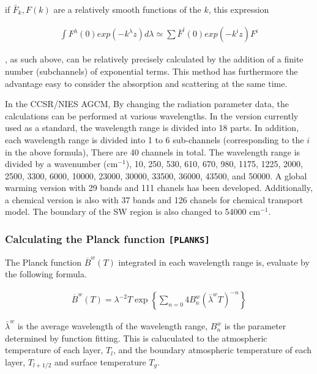 if \(\bar{F}_k, F(k)\) are a relatively smooth functions of the \(k\), this expression

\begin{eqnarray}
 \int F^\lambda(0) exp (-k^\lambda z) d \lambda 
 \simeq \sum \bar{F}^i(0) exp (-k^i z) F^i
\end{eqnarray}

\begin{quote}
\protect\hypertarget{p-rad:beer-kd}{}{ }
\end{quote}

, as such above, can be relatively precisely calculated by the addition of 
a finite number (subchannels) of exponential terms. This method has furthermore 
the advantage  easy to consider the absorption and scattering at the same time.

In the CCSR/NIES AGCM, By changing the radiation parameter data, the 
calculations can be performed at various wavelengths. In the version currently used
as a standard, the wavelength range is divided into 18 parts. In
addition, each wavelength range is divided into 1 to 6 sub-channels
(corresponding to the \(i\) in the above formula), There are 40
channels in total. The wavelength range is divided by a wavenumber (cm\(^{-1}\)),
10, 250, 530, 610, 670, 980, 1175, 1225, 2000, 2500, 3300, 6000, 10000, 23000, 
30000, 33500, 36000, 43500, and 50000. A global warming version with 29 bands and
111 chanels has been developed. Additionally, a chemical version is also with 37 
bands and 126 chanels for chemical transport model. The boundary of the SW region 
is also changed to 54000 cm\(^{-1}\).

\hypertarget{calculating-the-planck-function-moduleplanks}{%
\subsubsection{\texorpdfstring{Calculating the Planck function
\texttt{{[}PLANKS{]}}}{Calculating the Planck function {[}PLANKS{]}}}
\label{calculating-the-planck-function-moduleplanks}}

The Planck function \(\overline{B}^w(T)\) integrated in each wavelength
range is, evaluate by the following formula.

\begin{eqnarray}
  \overline{B}^w(T) 
   = \lambda^{-2} T \exp \left\{ \sum_{n=0}{4} B^w_n (\bar{\lambda}^w T)^{-n}
                         \right\}
\end{eqnarray}

\(\bar{\lambda}^w\) is the average wavelength of the wavelength range,
\(B^w_n\) is the parameter determined by function fitting. This is caluculated to the
atmospheric temperature of each layer, \(T_l\), and the boundary
atmospheric temperature of each layer, \(T_{l+1/2}\) and surface
temperature \(T_g\).

